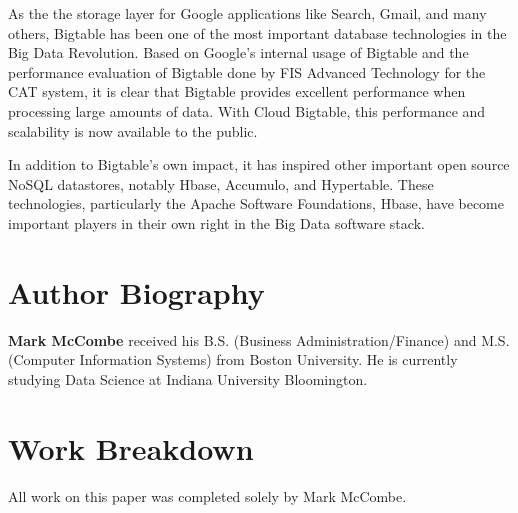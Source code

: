 \documentclass[9pt,twocolumn,twoside]{styles/osajnl}
\begin{document}
As the the storage layer for Google applications like Search, Gmail, and many others, Bigtable has been one of the most important database technologies in the Big Data Revolution. Based on Google's internal usage of Bigtable and the performance evaluation of Bigtable done by FIS Advanced Technology for the CAT system, it is clear that Bigtable provides excellent performance when processing large amounts of data. With Cloud Bigtable, this performance and scalability is now available to the public.  

In addition to Bigtable's own impact, it has inspired other important open source NoSQL datastores, notably Hbase, Accumulo, and Hypertable.  These technologies, particularly the Apache Software Foundations, Hbase, have become important players in their own right in the Big Data software stack. 



 
\section*{Author Biography}
\begingroup
\setlength\intextsep{0pt}
\begin{minipage}[t][3.2cm][t]{1.0\columnwidth} %
  \noindent
  {\bfseries Mark McCombe} received his B.S. (Business Administration/Finance) and M.S. (Computer Information Systems) from Boston University.  He is currently studying Data Science at Indiana University Bloomington.
\end{minipage}
\endgroup

\newpage

\appendix

\section{Work Breakdown}

All work on this paper was completed solely by Mark McCombe.
\end{document}
